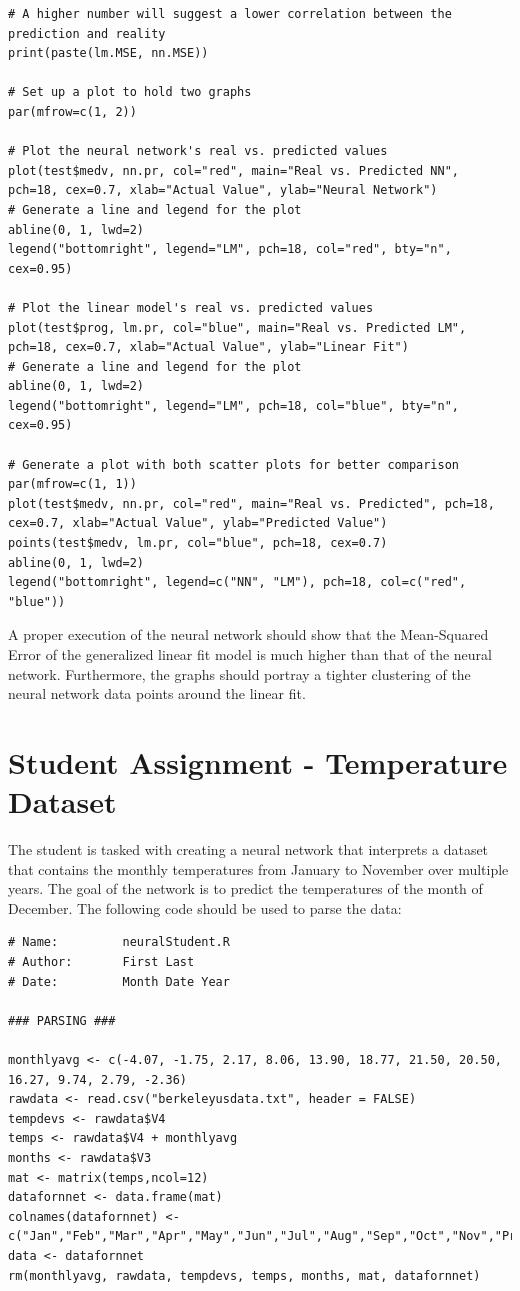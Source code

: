 \begin{lstlisting}
# A higher number will suggest a lower correlation between the prediction and reality
print(paste(lm.MSE, nn.MSE))

# Set up a plot to hold two graphs
par(mfrow=c(1, 2))

# Plot the neural network's real vs. predicted values
plot(test$medv, nn.pr, col="red", main="Real vs. Predicted NN", pch=18, cex=0.7, xlab="Actual Value", ylab="Neural Network")
# Generate a line and legend for the plot
abline(0, 1, lwd=2)
legend("bottomright", legend="LM", pch=18, col="red", bty="n", cex=0.95)

# Plot the linear model's real vs. predicted values
plot(test$prog, lm.pr, col="blue", main="Real vs. Predicted LM", pch=18, cex=0.7, xlab="Actual Value", ylab="Linear Fit")
# Generate a line and legend for the plot
abline(0, 1, lwd=2)
legend("bottomright", legend="LM", pch=18, col="blue", bty="n", cex=0.95)

# Generate a plot with both scatter plots for better comparison
par(mfrow=c(1, 1))
plot(test$medv, nn.pr, col="red", main="Real vs. Predicted", pch=18, cex=0.7, xlab="Actual Value", ylab="Predicted Value")
points(test$medv, lm.pr, col="blue", pch=18, cex=0.7)
abline(0, 1, lwd=2)
legend("bottomright", legend=c("NN", "LM"), pch=18, col=c("red", "blue"))
\end{lstlisting}

A proper execution of the neural network should show that the Mean-Squared Error of the generalized linear fit model is much higher than that of the neural network.
Furthermore, the graphs should portray a tighter clustering of the neural network data points around the linear fit. 

\section{Student Assignment - Temperature Dataset} 

The student is tasked with creating a neural network that interprets a dataset that contains the monthly temperatures from January to November over multiple years.
The goal of the network is to predict the temperatures of the month of December.
The following code should be used to parse the data:

\begin{lstlisting}
# Name:         neuralStudent.R
# Author:       First Last
# Date:         Month Date Year

### PARSING ###

monthlyavg <- c(-4.07, -1.75, 2.17, 8.06, 13.90, 18.77, 21.50, 20.50, 16.27, 9.74, 2.79, -2.36)
rawdata <- read.csv("berkeleyusdata.txt", header = FALSE)
tempdevs <- rawdata$V4
temps <- rawdata$V4 + monthlyavg
months <- rawdata$V3
mat <- matrix(temps,ncol=12)
datafornnet <- data.frame(mat)
colnames(datafornnet) <- c("Jan","Feb","Mar","Apr","May","Jun","Jul","Aug","Sep","Oct","Nov","Prog")
data <- datafornnet
rm(monthlyavg, rawdata, tempdevs, temps, months, mat, datafornnet)
\end{lstlisting}

